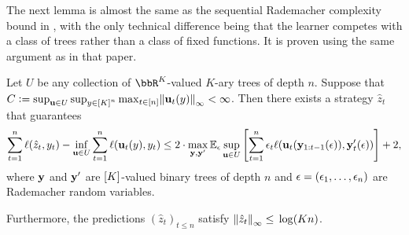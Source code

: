 The next lemma is almost the same as the sequential Rademacher complexity bound in \cite{RakSriTew10}, with the only technical difference being that the learner competes with a class of trees rather than a class of fixed functions. It is proven using the same argument as in that paper.
\begin{lemma}
  \label{lem:rademacher_strategy}
  Let $U$ be any collection of $\bbR^{K}$-valued $K$-ary trees of depth $n$. Suppose that $C\ldef\sup_{\uu\in{}U}\sup_{y\in\brk*{K}^{n}}\max_{t\in\brk*{n}}\nrm*{\uu_{t}(y)}_{\infty}<\infty$. Then there exists a strategy $\hat{z}_{t}$ that guarantees
  \[
    \sum_{t=1}^{n}\ls(\zh_t, y_t) - \inf_{\uu\in{}U}\sum_{t=1}^{n}\ls(\uu_{t}(y), y_t) \leq{} 2\cdot\max_{\y,\y'}\Enn_{\eps}\sup_{\uu\in{}U}\left[ \sum_{t=1}^n \eps_{t}\ell(\uu_{t}(\y_{1:t-1}(\eps)),\y'_t(\eps))\right] + 2,
  \]
  where $\y$ and $\y'$ are $\brk*{K}$-valued binary trees of depth $n$ and $\eps=(\eps_1,\ldots,\eps_n)$ are Rademacher random variables.

  Furthermore, the predictions $(\hat{z}_{t})_{t\leq{}n}$ satisfy $\nrm*{\hat{z}_{t}}_{\infty}\leq{}\log(Kn)$.

\end{lemma}
